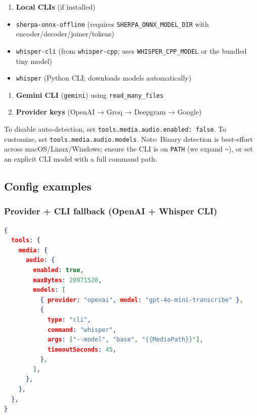 \begin{enumerate}
  \item \textbf{Local CLIs} (if installed)
\end{enumerate}

\begin{itemize}
  \item \texttt{sherpa-onnx-offline} (requires \texttt{SHERPA\_ONNX\_MODEL\_DIR} with encoder/decoder/joiner/tokens)
  \item \texttt{whisper-cli} (from \texttt{whisper-cpp}; uses \texttt{WHISPER\_CPP\_MODEL} or the bundled tiny model)
  \item \texttt{whisper} (Python CLI; downloads models automatically)
\end{itemize}

\begin{enumerate}
  \item \textbf{Gemini CLI} (\texttt{gemini}) using \texttt{read\_many\_files}
  \item \textbf{Provider keys} (OpenAI → Groq → Deepgram → Google)
\end{enumerate}


To disable auto-detection, set \texttt{tools.media.audio.enabled: false}.
To customize, set \texttt{tools.media.audio.models}.
Note: Binary detection is best-effort across macOS/Linux/Windows; ensure the CLI is on \texttt{PATH} (we expand \texttt{\textasciitilde{}}), or set an explicit CLI model with a full command path.

\subsection{Config examples}


\subsubsection{Provider + CLI fallback (OpenAI + Whisper CLI)}


\begin{lstlisting}[language=json]
{
  tools: {
    media: {
      audio: {
        enabled: true,
        maxBytes: 20971520,
        models: [
          { provider: "openai", model: "gpt-4o-mini-transcribe" },
          {
            type: "cli",
            command: "whisper",
            args: ["--model", "base", "{{MediaPath}}"],
            timeoutSeconds: 45,
          },
        ],
      },
    },
  },
}
\end{lstlisting}


